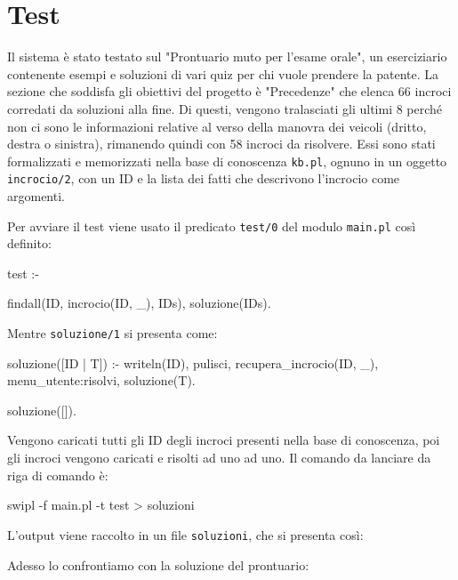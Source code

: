 \chapter{Test}
Il sistema è stato testato sul "Prontuario muto per l'esame orale"\cite{Prontuario}, un eserciziario contenente esempi e soluzioni di vari quiz per chi vuole prendere la patente. La sezione che soddisfa gli obiettivi del progetto è "Precedenze" che elenca 66 incroci corredati da soluzioni alla fine. Di questi, vengono tralasciati gli ultimi 8 perché non ci sono le informazioni relative al verso della manovra dei veicoli (dritto, destra o sinistra), rimanendo quindi con 58 incroci da risolvere. Essi sono stati formalizzati e memorizzati nella base di conoscenza \texttt{kb.pl}, ognuno in un oggetto \texttt{incrocio/2}, con un ID e la lista dei fatti che descrivono l'incrocio come argomenti.

Per avviare il test viene usato il predicato \texttt{test/0} del modulo \texttt{main.pl} così definito:

test :-
\begin{verbatimtab}
findall(ID, incrocio(ID, _), IDs),
	soluzione(IDs).
\end{verbatimtab}

\noindent
Mentre \texttt{soluzione/1} si presenta come:
\begin{verbatimtab}
soluzione([ID | T]) :-
	writeln(ID),
	pulisci,
	recupera_incrocio(ID, _),
	menu_utente:risolvi,
	soluzione(T).

soluzione([]).
\end{verbatimtab}

Vengono caricati tutti gli ID degli incroci presenti nella base di conoscenza, poi gli incroci vengono caricati e risolti ad uno ad uno. Il comando da lanciare da riga di comando è:
\begin{verbatimtab}
swipl -f main.pl -t test > soluzioni
\end{verbatimtab}

\noindent
L'output viene raccolto in un file \texttt{soluzioni}, che si presenta così:
\scriptsize

\normalsize
Adesso lo confrontiamo con la soluzione del prontuario:

